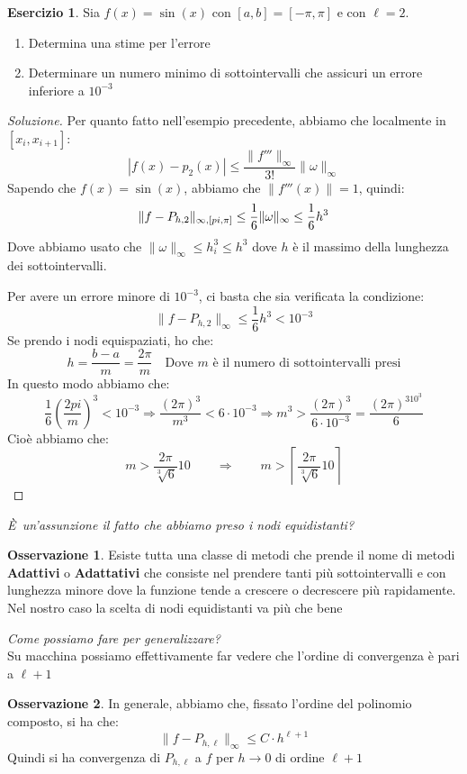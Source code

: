 \documentclass[11pt,a4paper,twoside]{article}
\theoremstyle{definition}
\newtheorem*{oss}{Osservazione}
\newtheorem*{ese}{Esercizio}
\newenvironment{sol}
	{\renewcommand\qedsymbol{$\blacksquare$}\begin{proof}[Soluzione]}
	{\end{proof}}
\begin{document}
\begin{ese}
	Sia $f(x) = \sin (x)$ con $[a,b] = [-\pi,\pi]$ e con $\ell = 2$.
	\begin{enumerate}
		\item Determina una stime per l'errore
		\item Determinare un numero minimo di sottointervalli che assicuri un errore inferiore a $10^{-3}$
	\end{enumerate}
\end{ese}

\begin{sol}
	 Per quanto fatto nell'esempio precedente, abbiamo che localmente in $[x_i, x_{i+1}]$:
	\[ |f(x) - p_2(x)| \leq \frac{\|f'''\|_\infty}{3!}\|\omega\|_\infty \]
	Sapendo che $f(x) = \sin(x)$, abbiamo che $\|f'''(x)\| = 1$, quindi:
	\[ \|f-P_{h,2}\|_{\infty, [\-pi, \pi]} \leq \frac 16 \|\omega\|_\infty \leq \frac 16 h^3 \]
	Dove abbiamo usato che $\|\omega\|_\infty \leq h_i^3 \leq h^3$ dove $h$ è il massimo della lunghezza dei sottointervalli.

	 Per avere un errore minore di $10^{-3}$, ci basta che sia verificata la condizione:
	\[ \|f-P_{h,2}\|_\infty \leq \frac 16 h^3 < 10^{-3} \]
	Se prendo i nodi equispaziati, ho che:
	\[ h = \frac{b-a}m = \frac{2\pi}m \quad \text{Dove }m\text{ è il numero di sottointervalli presi}\]
	In questo modo abbiamo che:
	\[ \frac 16 \left(\frac{2pi}m\right)^3 < 10^{-3} \Rightarrow \frac{(2\pi)^3}{m^3} < 6 \cdot 10^{-3} \Rightarrow m^3 > \frac{(2\pi)^3}{6 \cdot 10^{-3}} = \frac{(2 \pi)^310^3}6 \]
	Cioè abbiamo che:
	\[ m > \frac{2 \pi}{\sqrt[3]{6}}10 \qquad \Rightarrow \qquad m> \left\lceil \frac{2 \pi}{\sqrt[3]{6}}10 \right\rceil\]
\end{sol}

\textit{È un'assunzione il fatto che abbiamo preso i nodi equidistanti?}
\begin{oss}
	Esiste tutta una classe di metodi che prende il nome di metodi \textbf{Adattivi} o \textbf{Adattativi} che consiste nel prendere tanti più sottointervalli e con lunghezza minore dove la funzione tende a crescere o decrescere più rapidamente. Nel nostro caso la scelta di nodi equidistanti va più che bene
\end{oss}

\textit{Come possiamo fare per generalizzare?}\\
Su macchina possiamo effettivamente far vedere che l'ordine di convergenza è pari a $\ell + 1$

\begin{oss}
	In generale, abbiamo che, fissato l'ordine del polinomio composto, si ha che:
	\[ \|f-P_{h, \ell}\|_\infty \leq C \cdot h^{\ell+1}\]
	Quindi si ha convergenza di $P_{h,\ell}$ a $f$ per $h \to 0$ di ordine $\ell+1$
\end{oss}
\end{document}

